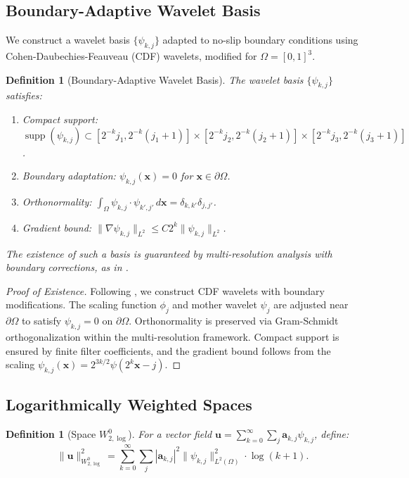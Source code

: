 \documentclass[12pt]{article}
\newtheorem{definition}[theorem]{Definition}
\DeclareMathOperator{\supp}{supp}
\begin{document}
\subsection{Boundary-Adaptive Wavelet Basis}
\label{sec:wavelet_basis}
We construct a wavelet basis $\{\psi_{k,j}\}$ adapted to no-slip boundary conditions 
using Cohen-Daubechies-Feauveau (CDF) wavelets, modified for $\Omega = [0,1]^3$.

\begin{definition}[Boundary-Adaptive Wavelet Basis]
\label{def:wavelet_basis}
The wavelet basis $\{\psi_{k,j}\}$ satisfies:
\begin{enumerate}
  \item Compact support: 
  $\supp(\psi_{k,j}) \subset [2^{-k}j_1, 2^{-k}(j_1+1)] \times 
  [2^{-k}j_2, 2^{-k}(j_2+1)] \times [2^{-k}j_3, 2^{-k}(j_3+1)]$.
  \item Boundary adaptation: $\psi_{k,j}(\mathbf{x}) = 0$ for 
  $\mathbf{x} \in \partial\Omega$.
  \item Orthonormality: 
  $\int_\Omega \psi_{k,j} \cdot \psi_{k',j'} \, d\mathbf{x} = \delta_{k,k'} \delta_{j,j'}$.
  \item Gradient bound: 
  $\|\nabla \psi_{k,j}\|_{L^2} \leq C 2^k \|\psi_{k,j}\|_{L^2}$.
\end{enumerate}
The existence of such a basis is guaranteed by multi-resolution analysis with 
boundary corrections, as in \cite{Cohen1993}.
\end{definition}

\begin{proof}[Proof of Existence]
Following \cite{Cohen1993}, we construct CDF wavelets with boundary modifications. 
The scaling function $\phi_j$ and mother wavelet $\psi_j$ are adjusted near 
$\partial\Omega$ to satisfy $\psi_{k,j} = 0$ on $\partial\Omega$. Orthonormality 
is preserved via Gram-Schmidt orthogonalization within the multi-resolution 
framework. Compact support is ensured by finite filter coefficients, and the 
gradient bound follows from the scaling $\psi_{k,j}(\mathbf{x}) = 2^{3k/2} \psi(2^k \mathbf{x} - j)$.
\end{proof}

\subsection{Logarithmically Weighted Spaces}
\begin{definition}[Space $W^0_{2,\log}$]
\label{def:W0_log}
For a vector field $\mathbf{u} = \sum_{k=0}^\infty \sum_j \mathbf{a}_{k,j} \psi_{k,j}$, 
define:
\begin{equation}
\|\mathbf{u}\|^2_{W^0_{2,\log}} = \sum_{k=0}^\infty \sum_j 
|\mathbf{a}_{k,j}|^2 \|\psi_{k,j}\|^2_{L^2(\Omega)} \cdot \log(k + 1).
\end{equation}
\end{definition}
\end{document}
